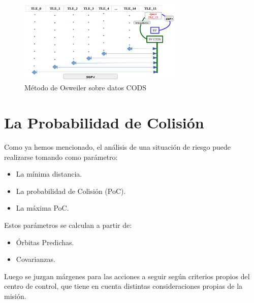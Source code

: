 \begin{figure}[!h]
 \centering
 \includegraphics[width=0.7\textwidth]{imagenes/Osweiler_sobre_Cods.png}
 \caption{M\'etodo de Osweiler sobre datos CODS}
\end{figure}

\section{La Probabilidad de Colisi\'on}

Como ya hemos mencionado, el an\'alisis de una situaci\'on de riesgo puede realizarse tomando como par\'ametro:\\
\begin{itemize}
 \item La m\'inima distancia.
 \item La probabilidad de Colisi\'on (PoC).
 \item La m\'axima PoC.
\end{itemize}

Estos par\'ametros se calculan a partir de:
\begin{itemize}
 \item \'Orbitas Predichas.
 \item Covarianzas.
\end{itemize}

Luego se juzgan m\'argenes para las acciones a seguir seg\'un criterios propios del centro de control, que tiene en cuenta distintas consideraciones propias de la misi\'on.\\ 



